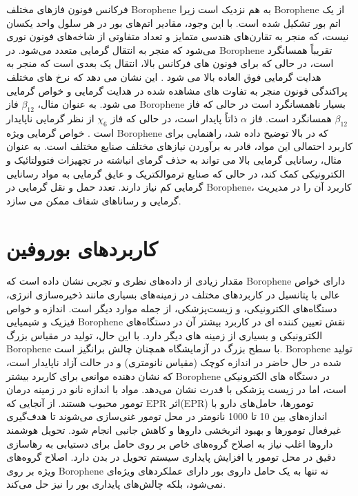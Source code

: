 فرکانس فونون فازهای مختلف \gls{Borophene} به هم نزدیک است زیرا \gls{Borophene} از یک اتم بور تشکیل شده است. با این وجود، مقادیر اتم‌های بور در هر سلول واحد یکسان نیست، که منجر به تقارن‌های هندسی متمایز و تعداد متفاوتی از شاخه‌های فونون نوری می‌شود که منجر به انتقال گرمایی متعدد می‌شود. در \gls{Borophene} تقریباً همسانگرد است، در حالی که برای فونون های فرکانس بالا، انتقال یک بعدی است که منجر به هدایت گرمایی فوق العاده بالا می شود \cite{zhouSuperiorLatticeThermal2017}. این نشان می دهد که نرخ های مختلف پراکندگی فونون منجر به تفاوت های مشاهده شده در هدایت گرمایی و خواص گرمایی می شود. به عنوان مثال، $\beta_{12}$ فاز \gls{Borophene} بسیار ناهمسانگرد است در حالی که فاز $\beta_{12}$ همسانگرد است. فاز $\alpha$ ذاتاً پایدار است، در حالی که فاز $\chi_6$ از نظر گرمایی ناپایدار است \cite{zhouSuperiorLatticeThermal2017, xiaoLatticeThermalConductivity2017}\cite{tsafackThermomechanicalAnalysisTwodimensional2016}.
خواص گرمایی ویژه \gls{Borophene} که در بالا توضیح داده شد، راهنمایی برای کاربرد احتمالی این مواد، قادر به برآوردن نیازهای مختلف صنایع مختلف است. به عنوان مثال، رسانایی گرمایی بالا می تواند به حذف گرمای انباشته در تجهیزات فتوولتائیک و الکترونیکی کمک کند، در حالی که صنایع ترموالکتریک و عایق گرمایی به مواد رسانایی گرمایی کم نیاز دارند. تعدد حمل و نقل گرمایی در \gls{Borophene}، کاربرد آن را در مدیریت گرمایی و رساناهای شفاف ممکن می سازد.

\section{کاربردهای بوروفین}
مقدار زیادی از داده‌های نظری و تجربی نشان داده است که \gls{Borophene} دارای خواص عالی با پتانسیل در کاربردهای مختلف در زمینه‌های بسیاری مانند ذخیره‌سازی انرژی، \cite{raoUltrahighEnergyStorage2017} دستگاه‌های الکترونیکی، \cite{pengTuningElectronicStructure2016, mortazaviBoropheneAnodeMaterial2016} و زیست‌پزشکی، \cite{jiNovelTopDownSynthesis2018} از جمله موارد دیگر است. اندازه و خواص فیزیک و شیمیایی \gls{Borophene} نقش تعیین کننده ای در کاربرد بیشتر آن در دستگاه‌های الکترونیکی و بسیاری از زمینه های دیگر دارد. با این حال، تولید در مقیاس بزرگ \gls{Borophene} با سطح بزرگ در آزمایشگاه همچنان چالش برانگیز است. \gls{Borophene} تولید شده در حال حاضر در اندازه کوچک (مقیاس نانومتری) و در حالت آزاد ناپایدار است، که نشان دهنده موانعی برای کاربرد بیشتر \gls{Borophene} در دستگاه های الکترونیکی است، اما در زیست پزشکی با قدرت نشان می‌دهد. مواد با اندازه نانو در زمینه درمان تومور محبوب هستند. از آنجایی که \glsdesc{EPR} اثر(\gls{EPR}) تومورها، حامل‌های دارو با اندازه‌های بین 10 تا 1000 نانومتر در محل تومور غنی‌سازی می‌شوند تا هدف‌گیری غیرفعال تومورها و بهبود اثربخشی داروها و کاهش جانبی انجام شود. تحویل هوشمند داروها اغلب نیاز به اصلاح گروه‌های خاص بر روی حامل برای دستیابی به رهاسازی دقیق در محل تومور یا افزایش پایداری سیستم تحویل در بدن دارد. اصلاح گروه‌های ویژه بر روی \gls{Borophene} نه تنها به یک حامل داروی بور دارای عملکردهای ویژه‌ای نمی‌شود، بلکه چالش‌های پایداری بور را نیز حل می‌کند.

